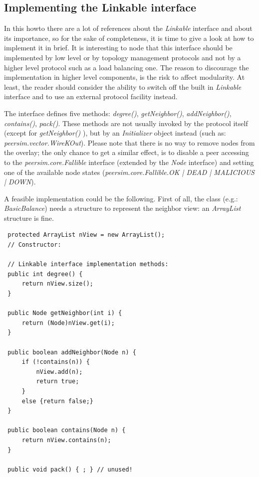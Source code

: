 \documentclass[a4paper,11pt]{article}
\begin{document}
\subsection{Implementing the Linkable interface}

In this howto there are a lot of references about the \emph{Linkable}
interface and about its importance, so for the sake of completeness,
it is time to give a look at how to implement it in brief. It is interesting
to node that this interface should be implemented by low level or
by topology management protocols and not by a higher level protocol
such as a load balancing one. The reason to discourage the
implementation in higher level components,
is the risk to affect modularity. At least, the reader should consider
the ability to switch off the built in \emph{Linkable} interface and
to use an external protocol facility instead.

The interface defines five methods: \emph{degree()}, \emph{getNeighbor()},
\emph{addNeighbor()}, \emph{contains()}, \emph{pack()}. These methods
are not usually invoked by the protocol itself (except for \emph{getNeighbor()}
), but by an \emph{Initializer} object instead (such as: 
\emph{peersim.vector.WireKOut}).
Please note that there
is no way to remove nodes from the overlay; the only chance to get
a similar effect, is to disable a peer accessing to the \emph{peersim.core.Fallible}
interface (extended by the \emph{Node} interface) and setting one
of the available node states (\emph{peersim.core.Fallible.OK | DEAD | 
MALICIOUS | DOWN}). 

A feasible implementation could be the following. First of all, the
class (e.g.: \emph{BasicBalance}) needs a structure to represent the
neighbor view: an \emph{ArrayList} structure is fine.

\footnotesize
\begin{verbatim}
 protected ArrayList nView = new ArrayList();
 // Constructor:
 
 // Linkable interface implementation methods:
 public int degree() {
     return nView.size();
 }
 
 public Node getNeighbor(int i) {
     return (Node)nView.get(i);
 } 
 
 public boolean addNeighbor(Node n) {
     if (!contains(n)) {
         nView.add(n);
         return true;
     }
     else {return false;}
 }
 
 public boolean contains(Node n) {
     return nView.contains(n);
 }
 
 public void pack() { ; } // unused!
\end{verbatim}
\normalsize
\end{document}
